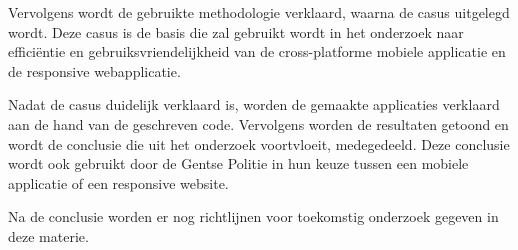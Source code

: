 Vervolgens wordt de gebruikte methodologie verklaard, waarna de casus uitgelegd wordt.
Deze casus is de basis die zal gebruikt wordt in het onderzoek naar efficiëntie en gebruiksvriendelijkheid van de
cross-platforme mobiele applicatie en de responsive webapplicatie.

Nadat de casus duidelijk verklaard is, worden de gemaakte applicaties verklaard aan de hand van de geschreven code.
Vervolgens worden de resultaten getoond en wordt de conclusie die uit het onderzoek voortvloeit, medegedeeld.
Deze conclusie wordt ook gebruikt door de Gentse Politie in hun keuze tussen een mobiele applicatie of een responsive website.

Na de conclusie worden er nog richtlijnen voor toekomstig onderzoek gegeven in deze materie.

